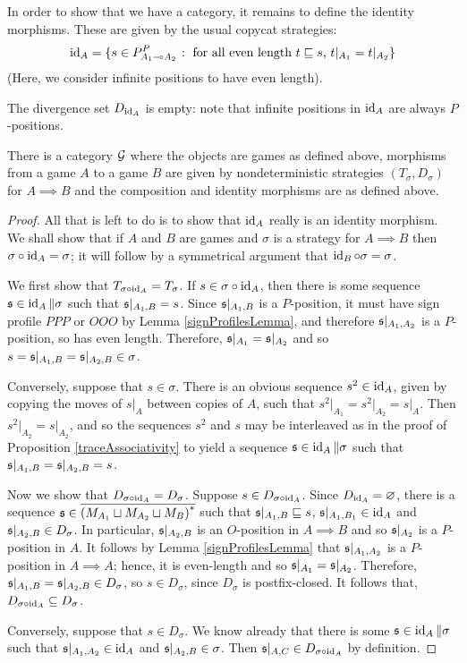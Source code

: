 \documentclass{article}
\begin{document}
In order to show that we have a category, it remains to define the identity morphisms.  These are given by the usual copycat strategies:
\[
  \operatorname{id}_A = \{s\in P_{A_1\multimap A_2}^P\;\colon\;\textrm{for all even length $t\sqsubseteq s$, $t\vert_{A_1}=t\vert_{A_2}$}\}
  \]
(Here, we consider infinite positions to have even length).

The divergence set $D_{\operatorname{id}_A}$ is empty: note that infinite positions in $\operatorname{id}_A$ are always $P$-positions.

\begin{theorem}
  There is a category $\mathcal G$ where the objects are games as defined above, morphisms from a game $A$ to a game $B$ are given by nondeterministic strategies $(T_\sigma, D_\sigma)$ for $A\implies B$ and the composition and identity morphisms are as defined above.
  \begin{proof}
    All that is left to do is to show that $\operatorname{id}_A$ really is an identity morphism.  We shall show that if $A$ and $B$ are games and $\sigma$ is a strategy for $A\implies B$ then $\sigma \circ \operatorname{id}_A=\sigma$; it will follow by a symmetrical argument that $\operatorname{id}_B \circ \sigma = \sigma$.

    We first show that $T_{\sigma \circ \operatorname{id}_A}=T_\sigma$.  If $s\in\sigma \circ \operatorname{id}_A$, then there is some sequence $\mathfrak s\in\operatorname{id}_A\|\sigma$ such that $\mathfrak s\vert_{A_1,B}=s$.  Since $\mathfrak s\vert_{A_1,B}$ is a $P$-position, it must have sign profile $PPP$ or $OOO$ by Lemma \ref{signProfilesLemma}, and therefore $\mathfrak s\vert_{A_1,A_2}$ is a $P$-position, so has even length.  Therefore, $\mathfrak s\vert_{A_1}=\mathfrak s\vert_{A_2}$ and so $s=\mathfrak s\vert_{A_1,B}=\mathfrak s\vert_{A_2,B}\in\sigma$.

    Conversely, suppose that $s\in\sigma$.  There is an obvious sequence $s^2\in\operatorname{id}_A$, given by copying the moves of $s\vert_A$ between copies of $A$, such that $s^2\vert_{A_1}=s^2\vert_{A_2}=s\vert_A$.  Then $s^2\vert_{A_2}=s\vert_{A_2}$, and so the sequences $s^2$ and $s$ may be interleaved as in the proof of Proposition \ref{traceAssociativity} to yield a sequence $\mathfrak s\in\operatorname{id}_A\|\sigma$ such that $\mathfrak s\vert_{A_1,B}=\mathfrak s\vert_{A_2,B}=s$.  

    Now we show that $D_{\sigma \circ \operatorname{id}_A}=D_\sigma$.  Suppose $s\in D_{\sigma \circ \operatorname{id}_A}$.  Since $D_{\operatorname{id}_A}=\varnothing$, there is a sequence $\mathfrak s\in{\overline{{(M_{A_1}\sqcup M_{A_2}\sqcup M_B)}^{*}}}$ such that $\mathfrak s\vert_{A_1,B}\sqsubseteq s$, $\mathfrak s\vert_{A_1,B_1}\in\operatorname{id}_A$ and $\mathfrak s\vert_{A_2,B}\in D_\sigma$.  In particular, $\mathfrak s\vert_{A_2,B}$ is an $O$-position in $A\implies B$ and so $\mathfrak s\vert_{A_2}$ is a $P$-position in $A$.  It follows by Lemma \ref{signProfilesLemma} that $\mathfrak s\vert_{A_1,A_2}$ is a $P$-position in $A\implies A$; hence, it is even-length and so $\mathfrak s\vert_{A_1}=\mathfrak s\vert_{A_2}$.  Therefore, $\mathfrak s\vert_{A_1,B}=\mathfrak s\vert_{A_2,B}\in D_\sigma$, so $s\in D_\sigma$, since $D_\sigma$ is postfix-closed.  It follows that, $D_{\sigma \circ \operatorname{id}_A}\subseteq D_\sigma$.  

    Conversely, suppose that $s\in D_\sigma$.  We know already that there is some $\mathfrak s\in\operatorname{id}_A\|\sigma$ such that $\mathfrak s\vert_{A_1,A_2}\in\operatorname{id}_A$ and $\mathfrak s\vert_{A_2,B}\in\sigma$.  Then $\mathfrak s\vert_{A,C}\in D_{\sigma \circ \operatorname{id}_A}$ by definition.
  \end{proof}
\end{theorem}
\end{document}
